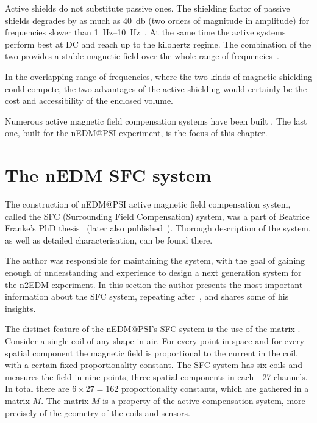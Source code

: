 Active shields do not substitute passive ones. The shielding factor
 of passive shields degrades by as much as \SI{40}{\decibel} (two orders of magnitude in amplitude) for frequencies slower than \SIrange[range-phrase = --]{1}{10}{\hertz}~\cite{Brake1991}. At the same time the active systems perform best at DC and reach up to the kilohertz regime. The combination of the two provides a stable magnetic field over the whole range of frequencies~\cite{Kelha1982,Brake1991,Voigt2013}.

In the overlapping range of frequencies, where the two kinds of magnetic shielding could compete, the two advantages of the active shielding would certainly be the cost and accessibility of the enclosed volume. 

Numerous active magnetic field compensation systems have been built \cite{Kelha1982,Brake1991,Spemann2003,Brys2005,Kobayashi2012,Voigt2013,Afach2014}. The last one, built for the nEDM@PSI experiment, is the focus of this chapter.


\section{The nEDM SFC system}
The construction of nEDM@PSI active magnetic field compensation system, called the SFC (Surrounding Field Compensation) system,
was a part of Beatrice Franke's PhD thesis~\cite{Franke2013} (later also published~\cite{Afach2014}). Thorough description of the system, as well as detailed characterisation, can be found there.

The author was responsible for maintaining the system, with the goal of gaining enough of understanding and experience to design a next generation system for the n2EDM experiment. In this section the author presents the most important information about the SFC system, repeating after~\cite{Franke2013}, and shares some of his insights. 

The distinct feature of the nEDM@PSI's SFC system is the use of the matrix . Consider a single coil of any shape in air. For every point in space and for every spatial component the magnetic field is proportional to the current in the coil, with a certain fixed proportionality constant. The SFC system has six coils and measures the field in nine points, three spatial components in each---27 channels. In total there are $6 \times 27 = 162$ proportionality constants, which are gathered in a matrix $M$. The matrix $M$ is a property of the active compensation system, more precisely of the geometry of the coils and sensors. 

